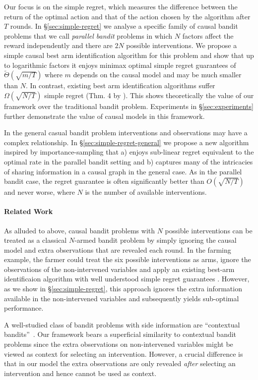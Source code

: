 Our focus is on the simple regret, which measures the difference between the return of the optimal action and that of the action chosen by the algorithm after $T$ rounds.
In \S\ref{sec:simple-regret} we analyse a specific family of causal bandit problems that we call \emph{parallel bandit} problems in which $N$ factors affect the reward independently and there are $2N$ possible interventions.
We propose a simple causal best arm identification algorithm for this problem and show that up to logarithmic factors it enjoys minimax optimal
simple regret guarantees of $\tilde\Theta(\sqrt{m/T})$ where $m$ depends on the causal model and may be much smaller than $N$.
In contrast, existing best arm identification algorithms suffer $\Omega(\sqrt{N/T})$ simple regret (Thm. 4 by \citet{audibert2010best}).
This shows theoretically the value of our framework over the traditional bandit problem. 
Experiments in \S\ref{sec:experiments} further demonstrate the value of causal models in this framework.

In the general casual bandit problem interventions and observations may have a complex relationship. 
In \S\ref{sec:simple-regret-general} we propose a new algorithm inspired by importance-sampling that a) enjoys sub-linear regret equivalent to the optimal rate in the parallel bandit setting and b) captures many of the intricacies of sharing information in a causal graph in the general case.
As in the parallel bandit case, the regret guarantee is often significantly better than $O(\sqrt{N/T})$ and never worse, where $N$ is the number of available interventions. 

\paragraph{Related Work} As alluded to above, causal bandit problems with $N$ possible interventions can be treated as a classical $N$-armed bandit problem by simply ignoring the causal model and extra observations that are revealed each round. In the farming example, the farmer could treat the six possible interventions as arms, ignore the observations of the non-intervened variables and apply an existing best-arm identificaion algorithm with well understood simple regret guarantees \citep{Jamieson2013}. However, as we show in \S\ref{sec:simple-regret}, this approach ignores the extra information available in the non-intervened variables and subsequently yields sub-optimal performance.

A well-studied class of bandit problems with side information are ``contextual bandits''~\cite{Langford2008,Agarwal2014}. Our framework bears a superficial similarity to contextual bandit problems since the extra observations on non-intervened variables might be viewed as context for selecting an intervention. 
However, a crucial difference is that in our model the extra observations are only revealed \emph{after} selecting an intervention and hence cannot be used as context. %

